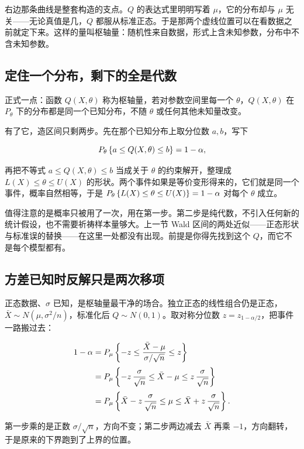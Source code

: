 右边那条曲线是整套构造的支点。\(Q\) 的表达式里明明写着 \(\mu\)，它的分布却与 \(\mu\) 无关——无论真值是几，\(Q\) 都服从标准正态。于是那两个虚线位置可以在看数据之前就定下来。这样的量叫枢轴量：随机性来自数据，形式上含未知参数，分布中不含未知参数。

\subsection{定住一个分布，剩下的全是代数}

正式一点：函数 \(Q(X,\theta)\) 称为枢轴量，若对参数空间里每一个 \(\theta\)，\(Q(X,\theta)\) 在 \(P_\theta\) 下的分布都是同一个已知分布，不随 \(\theta\) 或任何其他未知量改变。

有了它，造区间只剩两步。先在那个已知分布上取分位数 \(a,b\)，写下

\[
P_\theta\left\{a\le Q(X,\theta)\le b\right\}=1-\alpha ,
\]

再把不等式 \(a\le Q(X,\theta)\le b\) 当成关于 \(\theta\) 的约束解开，整理成 \(L(X)\le\theta\le U(X)\) 的形状。两个事件如果是等价变形得来的，它们就是同一个事件，概率自然相等，于是 \(P_\theta\left\{L(X)\le\theta\le U(X)\right\}=1-\alpha\) 对每个 \(\theta\) 成立。

值得注意的是概率只被用了一次，用在第一步。第二步是纯代数，不引入任何新的统计假设，也不需要祈祷样本量够大。上一节 Wald 区间的两处近似——正态形状与标准误的替换——在这里一处都没有出现。前提是你得先找到这个 \(Q\)，而它不是每个模型都有。

\subsection{方差已知时反解只是两次移项}

正态数据、\(\sigma\) 已知，是枢轴量最干净的场合。独立正态的线性组合仍是正态，\(\bar X\sim N(\mu,\sigma^2/n)\)，标准化后 \(Q\sim N(0,1)\)。取对称分位数 \(z=z_{1-\alpha/2}\)，把事件一路搬过去：

\[
\begin{aligned}
1-\alpha
&=P_\mu\left\{-z\le\frac{\bar X-\mu}{\sigma/\sqrt n}\le z\right\}\\[2pt]
&=P_\mu\left\{-z\,\frac{\sigma}{\sqrt n}\le\bar X-\mu\le z\,\frac{\sigma}{\sqrt n}\right\}\\[2pt]
&=P_\mu\left\{\bar X-z\,\frac{\sigma}{\sqrt n}\le\mu\le\bar X+z\,\frac{\sigma}{\sqrt n}\right\} .
\end{aligned}
\]

第一步乘的是正数 \(\sigma/\sqrt n\)，方向不变；第二步两边减去 \(\bar X\) 再乘 \(-1\)，方向翻转，于是原来的下界跑到了上界的位置。

